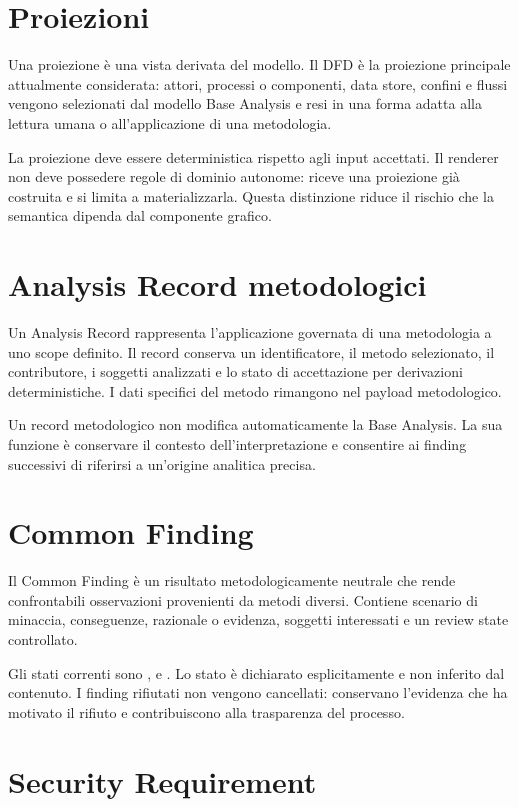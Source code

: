 \documentclass[12pt,a4paper,oneside]{report}
\newcommand{\artifact}[1]{{\ttfamily\seqsplit{#1}}}
\begin{document}
\section{Proiezioni}

Una proiezione è una vista derivata del modello. Il DFD è la proiezione principale attualmente considerata: attori, processi o componenti, data store, confini e flussi vengono selezionati dal modello Base Analysis e resi in una forma adatta alla lettura umana o all'applicazione di una metodologia.

La proiezione deve essere deterministica rispetto agli input accettati. Il renderer non deve possedere regole di dominio autonome: riceve una proiezione già costruita e si limita a materializzarla. Questa distinzione riduce il rischio che la semantica dipenda dal componente grafico.

\section{Analysis Record metodologici}

Un Analysis Record rappresenta l'applicazione governata di una metodologia a uno scope definito. Il record conserva un identificatore, il metodo selezionato, il contributore, i soggetti analizzati e lo stato di accettazione per derivazioni deterministiche. I dati specifici del metodo rimangono nel payload metodologico.

Un record metodologico non modifica automaticamente la Base Analysis. La sua funzione è conservare il contesto dell'interpretazione e consentire ai finding successivi di riferirsi a un'origine analitica precisa.

\section{Common Finding}

Il Common Finding è un risultato metodologicamente neutrale che rende confrontabili osservazioni provenienti da metodi diversi. Contiene scenario di minaccia, conseguenze, razionale o evidenza, soggetti interessati e un review state controllato.

Gli stati correnti sono \artifact{proposed}, \artifact{accepted} e \artifact{rejected}. Lo stato è dichiarato esplicitamente e non inferito dal contenuto. I finding rifiutati non vengono cancellati: conservano l'evidenza che ha motivato il rifiuto e contribuiscono alla trasparenza del processo.

\section{Security Requirement}
\end{document}
